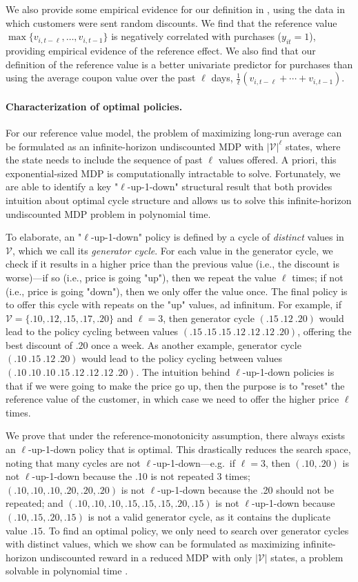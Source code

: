 \documentclass[format=acmsmall, review=false]{acmart}
\newcommand{\luid}{$\ell$-up-1-down\xspace}
\newcommand{\cV}{\mathcal{V}}
\begin{document}
We also provide some empirical evidence for our definition in \textbf{}, using the data in which customers were sent random discounts.  We find that the reference value $\max\{v_{i,t-\ell},\ldots,v_{i,t-1}\}$ is negatively correlated with purchases ($y_{it}=1$), providing empirical evidence of the reference effect.
We also find that our definition of the reference value is a better univariate predictor for purchases than using the average coupon value over the past $\ell$ days, $\frac{1}{\ell}(v_{i,t-\ell}+\cdots+v_{i,t-1})$.

\paragraph{Characterization of optimal policies.}
For our reference value model, the problem of maximizing long-run average can be formulated as an infinite-horizon undiscounted MDP with $|\cV|^\ell$ states, where the state needs to include the sequence of past $\ell$ values offered.  A priori, this exponential-sized MDP is computationally intractable to solve.
Fortunately, we are able to identify a key "$\ell$-up-1-down" structural result that both provides intuition about optimal cycle structure and allows us to solve this infinite-horizon undiscounted MDP problem in polynomial time.

To elaborate, an "$\ell$-up-1-down" policy is defined by a cycle of \textit{distinct} values in $\cV$, which we call its \textit{generator cycle}.
For each value in the generator cycle, we check if it results in a higher price than the previous value (i.e., the discount is worse)---if so (i.e., price is going "up"), then we repeat the value $\ell$ times; if not (i.e., price is going "down"), then we only offer the value once.
The final policy is to offer this cycle with repeats on the "up" values, ad infinitum.
For example, if $\cV=\{.10,.12,.15,.17,.20\}$ and $\ell=3$, then generator cycle $(.15\ .12\ .20)$ would lead to the policy cycling between values $(.15\ .15\ .15\ .12\ .12\ .12\ .20)$, offering the best discount of $.20$ once a week.  As another example, generator cycle $(.10\ .15\ .12\ .20)$ would lead to the policy cycling between values $(.10\ .10\ .10\ .15\ .12\ .12\ .12\ .20)$.
The intuition behind \luid policies is that if we were going to make the price go up, then the purpose is to "reset" the reference value of the customer, in which case we need to offer the higher price $\ell$ times.

We prove that under the reference-monotonicity assumption, there always exists an \luid policy that is optimal.
This drastically reduces the search space, noting that many cycles are not \luid---e.g.\ if $\ell=3$, then $(.10,.20)$ is not \luid because the .10 is not repeated 3 times;
$(.10,.10,.10,.20,.20,.20)$ is not \luid because the .20 should not be repeated;
and $(.10,.10,.10,.15,.15,.15,.20,.15)$ is not \luid because $(.10,.15,.20,.15)$ is not a valid generator cycle, as it contains the duplicate value $.15$.
To find an optimal policy, we only need to search over generator cycles with distinct values, which we show can be formulated as maximizing infinite-horizon undiscounted reward in a reduced MDP with only $|\cV|$ states, a problem solvable in polynomial time \citep{puterman2014markov}.
\end{document}
